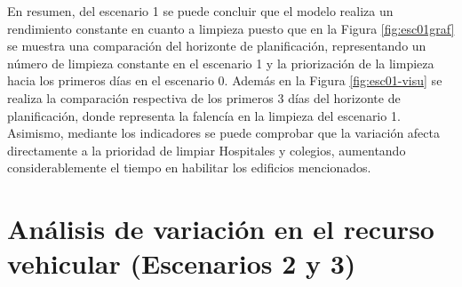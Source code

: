 \documentclass[12pt,a4paper]{article}
\begin{document}
En resumen, del escenario 1 se puede concluir que el modelo realiza un rendimiento constante en cuanto a limpieza puesto que en la Figura \ref{fig:esc01graf} se muestra una comparación del horizonte de planificación, representando un número de limpieza constante en el escenario 1 y la priorización de la limpieza hacia los primeros días en el escenario 0. Además en la Figura \ref{fig:esc01-visu} se realiza la comparación respectiva de los primeros 3 días del horizonte de planificación, donde representa la falencía en la limpieza del escenario 1. Asimismo, mediante los indicadores se puede comprobar que la variación afecta directamente a la prioridad de limpiar Hospitales y colegios, aumentando considerablemente el tiempo en habilitar los edificios mencionados.




\section{Análisis de variación en el recurso vehicular (Escenarios 2 y 3)}
\end{document}
